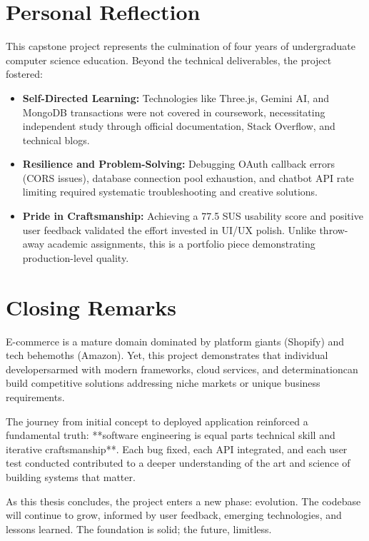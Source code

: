 \documentclass[12pt, a4paper]{report}
\begin{document}
\section{Personal Reflection}

This capstone project represents the culmination of four years of undergraduate computer science education. Beyond the technical deliverables, the project fostered:

\begin{itemize}
    \item \textbf{Self-Directed Learning:} Technologies like Three.js, Gemini AI, and MongoDB transactions were not covered in coursework, necessitating independent study through official documentation, Stack Overflow, and technical blogs.
    
    \item \textbf{Resilience and Problem-Solving:} Debugging OAuth callback errors (CORS issues), database connection pool exhaustion, and chatbot API rate limiting required systematic troubleshooting and creative solutions.
    
    \item \textbf{Pride in Craftsmanship:} Achieving a 77.5 SUS usability score and positive user feedback validated the effort invested in UI/UX polish. Unlike throw-away academic assignments, this is a portfolio piece demonstrating production-level quality.
\end{itemize}

\section{Closing Remarks}

E-commerce is a mature domain dominated by platform giants (Shopify) and tech behemoths (Amazon). Yet, this project demonstrates that individual developersarmed with modern frameworks, cloud services, and determinationcan build competitive solutions addressing niche markets or unique business requirements.

The journey from initial concept to deployed application reinforced a fundamental truth: **software engineering is equal parts technical skill and iterative craftsmanship**. Each bug fixed, each API integrated, and each user test conducted contributed to a deeper understanding of the art and science of building systems that matter.

As this thesis concludes, the project enters a new phase: evolution. The codebase will continue to grow, informed by user feedback, emerging technologies, and lessons learned. The foundation is solid; the future, limitless.
\end{document}
